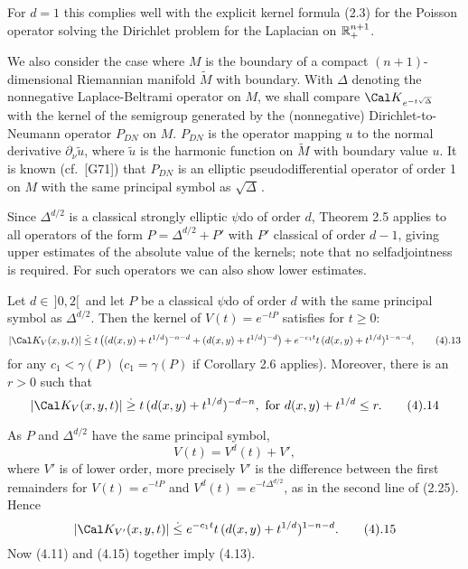 \enddemo

For $d=1$ this complies well with the explicit kernel
formula (2.3) for the Poisson operator solving the Dirichlet problem
for the Laplacian on ${\Bbb R}^{n+1}_+$.


We also consider the case where $M$ is the boundary of  a compact
$(n+1)$-dimensional Riemannian manifold $\widetilde M$
with boundary. With $\Delta  $ denoting the nonnegative Laplace-Beltrami
operator on $M$, we shall compare  ${\Cal K}_{e^{-t\sqrt{\Delta  }\,}}$
with the kernel of the semigroup generated by the (nonnegative)
Dirichlet-to-Neumann
operator $P_{DN}$ on $M$. $P_{DN}$ is the operator mapping $u$ to the
normal derivative
$\partial_\nu \widetilde u$, where $\widetilde u$ is the harmonic
function on $\widetilde M$ with boundary value $u$.
It is known (cf.\ [G71]) that $P_{DN}$ is an elliptic
pseudodifferential operator of order 1 on $M$ with the same principal
symbol as $\sqrt{\Delta  }\,$.



Since $\Delta ^{d/2}$ is a classical strongly elliptic $\psi $do of
order $d$,
Theorem 2.5 applies to all operators of
the form $P=\Delta ^{d/2}+P'$ with $P'$ classical of order
$d-1$, giving upper estimates of the absolute value of the
kernels; note that no selfadjointness is required. For such operators
we can also show lower estimates.


 Let $d\in \,]0,2[\,$ and let $P$ be a classical $\psi
$do of order $d$ with the same principal
symbol as $\Delta^{d/2}$.
Then the kernel of $V(t)=e^{-tP}$ satisfies for $t\ge 0$:
$$
|\Cal K_{V}(x,y,t)|\leg  t\,\bigl( (d(x,y)+t^{1/d})^{-n-d}+(d(x,y)+t^{1/d})^{-d}\bigr)
+e^{-c_1t}t\,(d(x,y)+t^{1/d})^{1-n-d},\tag4.13
$$
for any $c_1<\gamma (P)$ ($c_1=\gamma (P)$ if Corollary {\rm 2.6}
applies). Moreover, there is an $r>0$ such that
$$
|\Cal K_{V}(x,y,t)|\geg
 t\,(d(x,y)+t^{1/d})^{-d-n} ,\text{ for }d(x,y)+t^{1/d}\le r.\tag4.14
$$
\endproclaim

 As $P$ and $\Delta^{d/2}$ have the same principal symbol,
$$
V(t)=V^d(t)+V' ,
$$
where $V'$ is of lower order, more precisely $V'$
is the difference between the first remainders for $V(t)=e^{-tP}$ and
$V^d(t)=e^{-t\Delta^{d/2}}$, as in the second line of (2.25). Hence
$$
|\Cal K_{V'}(x,y,t)|\leg  e^{-c_1 t}t\, (d(x,y)+t^{1/d})^{1-n-d}.
\tag4.15
$$
Now (4.11) and (4.15) together imply (4.13).

